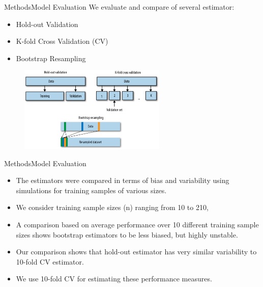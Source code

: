 \documentclass[xcolor=table]{beamer}
\numberwithin{figure}{section}
\numberwithin{equation}{section}
\begin{document}
\begin{frame}{Methods}{Model Evaluation}
We evaluate and compare of several estimator: 
\begin{itemize}
    \item Hold-out Validation
    \item K-fold Cross Validation (CV)
    \item Bootstrap Resampling
\end{itemize}
\begin{figure}
\centering
\includegraphics[width=70mm]{pictures/CV.png}
\end{figure}
\end{frame}

\begin{frame}{Methods}{Model Evaluation}
\begin{itemize}
    \item  The estimators were compared in terms of bias and variability using simulations for training samples of various sizes. 
    \item We consider training sample sizes (n) ranging from 10 to 210, 
    \item A comparison based on average performance over 10 different training sample sizes shows bootstrap estimators to be less biased, but highly unstable.
    \item Our comparison shows that hold-out estimator has very similar variability to 10-fold CV estimator.
    \item We use 10-fold CV for estimating these performance measures.
\end{itemize}

\end{frame}
\end{document}
